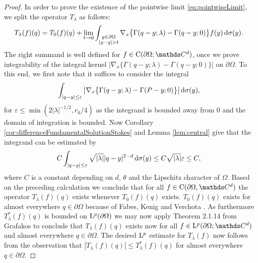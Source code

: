 \begin{proof}
   In order to prove the existence of the pointwise limit \eqref{eq:pointwiseLimit},  we split the operator $T_\lambda$ as follows:
   \begin{align*}
     T_\lambda(f)(q) = T_0(f)(q) + \lim_{t \to 0} \int_{\substack{y \in \partial\Omega \\ |y - q| > t}} \nabla_x \big\{ \Gamma(q - y; \lambda) - \Gamma(q - y; 0)\big\}  f(y) \, {\operatorname{d}\!{\sigma}}(y).
   \end{align*}
   The right summand is well defined for $f \in \CC(\partial\Omega; \C^d)$, once we prove integrability of the integral kernel $\big|\nabla_x \big\{\Gamma(q - y; \lambda) - \Gamma(q - y; 0)\big\} \big|$ on $\partial\Omega$.
   To this end, we first note that it suffices to consider the integral
   \begin{align*}
     \int_{|q - y| \leq \varepsilon} \big| \nabla_x\big\{ \Gamma(q - y; \lambda) - \Gamma(P - y; 0) \big\} \big| \, {\operatorname{d}\!{\sigma}}(y), 
   \end{align*}
   for $\varepsilon \leq \min(2|\lambda|^{-1/2}, r_0/4)$ as the integrand is bounded away from $0$ and the domain of integration is bounded.
   Now Corollary \ref{cor:differenceFundamentalSolutionStokes} and Lemma \ref{lem:central} give that the integrand can be estimated by
   \begin{align*}
     C \int_{|q - y| \leq \varepsilon} \sqrt{|\lambda|} |q - y|^{2 - d} \, {\operatorname{d}\!{\sigma}}(y) \leq C \sqrt{|\lambda|} \varepsilon \leq C,
   \end{align*}
   where $C$ is a constant depending on $d$, $\theta$ and the Lipschitz character of $\Omega$.
   Based on the preceding calculation we conclude that for all $f \in \CC(\partial\Omega,\C^d)$ the operator $T_\lambda(f)(q)$ exists whenever $T_0(f)(q)$ exists.
   $T_0(f)(q)$ exists for almost everywhere $q \in \partial\Omega$ because of Fabes, Kenig and Verchota \cite{fabesKenigVerchota}.
   As furthermore $T_\lambda^*(f)(q)$ is bounded on $\mathrm{L}^p(\partial\Omega)$  we may now apply Theorem 2.1.14 from Grafakos \cite{grafakos2014classical} to conclude that $T_\lambda(f)(q)$ exists now for all $f \in \Ell^p(\partial\Omega; \C^d)$ and almost everywhere $q \in \partial\Omega$.
   The desired $\mathrm{L}^p$ estimate for $T_\lambda(f)$ now follows from the observation that $| T_\lambda(f)(q) | \leq T_\lambda^*(f)(q)$ for almost everywhere $q \in \partial\Omega$.
\end{proof}


